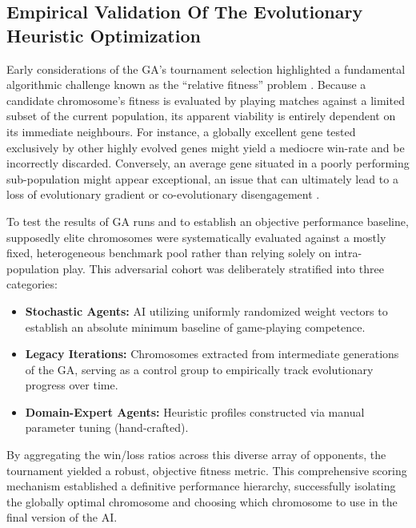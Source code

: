 \subsection{Empirical Validation Of The Evolutionary Heuristic Optimization} \label{GA testing}

Early considerations of the GA's tournament selection highlighted a fundamental algorithmic challenge known as the ``relative fitness'' problem \cite{rosin1997new}. Because a candidate chromosome's fitness is evaluated by playing matches against a limited subset of the current population, its apparent viability is entirely dependent on its immediate neighbours. For instance, a globally excellent gene tested exclusively by other highly evolved genes might yield a mediocre win-rate and be incorrectly discarded. Conversely, an average gene situated in a poorly performing sub-population might appear exceptional, an issue that can ultimately lead to a loss of evolutionary gradient or co-evolutionary disengagement \cite{ficici2000game}.

To test the results of GA runs and to establish an objective performance baseline, supposedly elite chromosomes were systematically evaluated against a mostly fixed, heterogeneous benchmark pool rather than relying solely on intra-population play. This adversarial cohort was deliberately stratified into three categories:

\begin{itemize}
  \item \textbf{Stochastic Agents:} AI utilizing uniformly randomized weight vectors to establish an absolute minimum baseline of game-playing competence.
  \item \textbf{Legacy Iterations:} Chromosomes extracted from intermediate generations of the GA, serving as a control group to empirically track evolutionary progress over time.
  \item \textbf{Domain-Expert Agents:} Heuristic profiles constructed via manual parameter tuning (hand-crafted).
\end{itemize}

By aggregating the win/loss ratios across this diverse array of opponents, the tournament yielded a robust, objective fitness metric. This comprehensive scoring mechanism established a definitive performance hierarchy, successfully isolating the globally optimal chromosome and choosing which chromosome to use in the final version of the AI.




